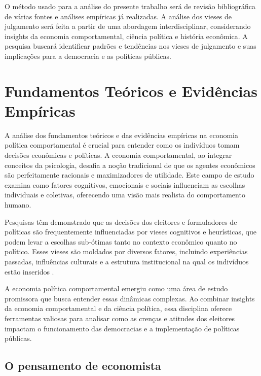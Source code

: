 O método usado para a análise do presente trabalho será de revisão bibliográfica de várias fontes e análises empíricas já realizadas. A análise dos vieses de julgamento será feita a partir de uma abordagem interdisciplinar, considerando insights da economia comportamental, ciência política e história econômica. A pesquisa buscará identificar padrões e tendências nos vieses de julgamento e suas implicações para a democracia e as políticas públicas.

\section{Fundamentos Teóricos e Evidências Empíricas}

A análise dos fundamentos teóricos e das evidências empíricas na economia política comportamental é crucial para entender como os indivíduos tomam decisões econômicas e políticas. A economia comportamental, ao integrar conceitos da psicologia, desafia a noção tradicional de que os agentes econômicos são perfeitamente racionais e maximizadores de utilidade. Este campo de estudo examina como fatores cognitivos, emocionais e sociais influenciam as escolhas individuais e coletivas, oferecendo uma visão mais realista do comportamento humano.

Pesquisas têm demonstrado que as decisões dos eleitores e formuladores de políticas são frequentemente influenciadas por vieses cognitivos e heurísticas, que podem levar a escolhas sub-ótimas tanto no contexto econômico quanto no político. Esses vieses são moldados por diversos fatores, incluindo experiências passadas, influências culturais e a estrutura institucional na qual os indivíduos estão inseridos \cite{The_Myth_of_the_Rational_Voter, Systematically_Biased_Beliefs_about_Economics, saee1996}. 

A economia política comportamental emergiu como uma área de estudo promissora que busca entender essas dinâmicas complexas. Ao combinar insights da economia comportamental e da ciência política, essa disciplina oferece ferramentas valiosas para analisar como as crenças e atitudes dos eleitores impactam o funcionamento das democracias e a implementação de políticas públicas.


\subsection{O pensamento de economista} 

